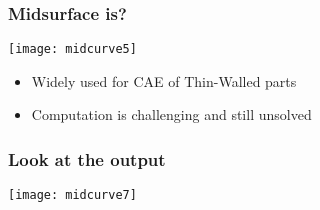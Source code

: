 \begin{frame}[fragile]\frametitle{Midsurface is?}
\begin{center}
\texttt{[image: midcurve5]}
\end{center}
	\begin{itemize}
	\item Widely used for CAE of Thin-Walled parts
	\item Computation is challenging and still unsolved
	\end{itemize}
	
\end{frame}



\begin{frame}[fragile]\frametitle{Look at the output}
\begin{center}
\texttt{[image: midcurve7]}
\end{center}	
\end{frame}



